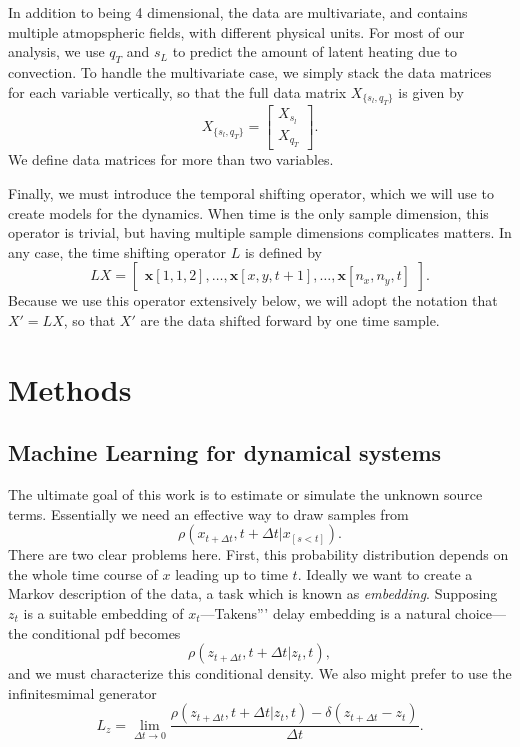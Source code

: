 \documentclass{report}
\newcommand{\1}[1]{\mathds{1}\left[#1\right]}
\begin{document}
In addition to being 4 dimensional, the data are multivariate, and contains
multiple atmopspheric fields, with different physical units. For most of our
analysis, we use $q_T$ and $s_L$ to predict the amount of latent heating due to
convection. To handle the multivariate case, we simply stack the data matrices
for each variable vertically, so that the full data matrix $X_{\{s_l, q_T\}}$ is given by
\[
  X_{\{s_l, q_T\}}=\begin{bmatrix}
    X_{s_l}\\
    X_{q_T}
  \end{bmatrix}.
\]
We define data matrices for more than two variables.

Finally, we must introduce the temporal shifting operator, which we will use to
create models for the dynamics. When time is the only sample dimension, this
operator is trivial, but having multiple sample dimensions complicates matters.
In any case, the time shifting  operator $L$ is defined by
\[
  LX =
  \begin{bmatrix}
    \mathbf{x}[1,1,2],\ldots,\mathbf{x}[x, y, t+1], \ldots, \mathbf{x}[n_x, n_y, t]
  \end{bmatrix}.
\]
Because we use this operator extensively below, we will adopt the notation that $X' =
LX$, so that $X'$ are the data shifted forward by one time sample.

\chapter{Methods}

\section{Machine Learning for dynamical systems}

The ultimate goal of this work is to estimate or simulate the unknown source
terms. Essentially we need an effective way to draw samples
from
\[ \rho(x_{t+\Delta t}, t + \Delta t |x_{[s < t]}).\] There are two clear problems here. 
First, this probability distribution depends on the whole time course of
$x$ leading up to time $t$. 
Ideally we want to create a Markov description of the data, a task which is
known as \emph{embedding}. 
Supposing $z_t$ is a suitable embedding of $x_t$---Takens''' delay embedding is a natural choice---the conditional pdf becomes
\[\rho(z_{t+\Delta t}, t+ \Delta t| z_t, t),\]
and we must characterize this conditional density.
We also might prefer to use the infinitesmimal generator
\[L_z = \lim_{\Delta t \rightarrow 0} \frac{\rho(z_{t+\Delta t}, t+ \Delta t| z_t,
    t) - \delta(z_{t+\Delta t} - z_t) }{\Delta t}.\]
\end{document}
